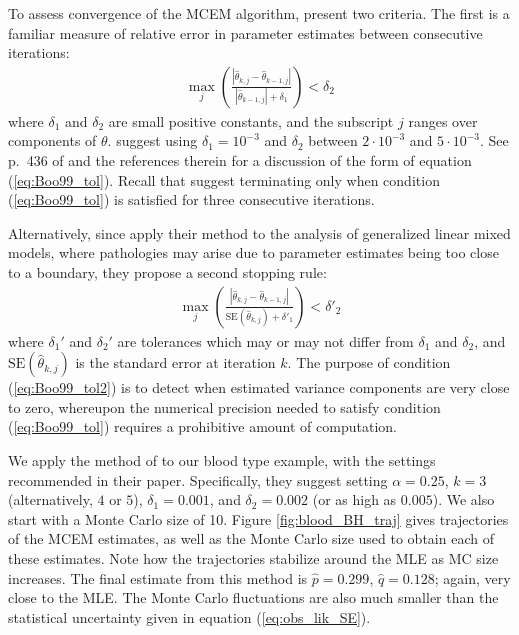 \documentclass[11pt, oneside]{article}   	%
\begin{document}
To assess convergence of the MCEM algorithm, \citeauthor{Boo99} present two criteria. The first is a familiar measure of relative error in parameter estimates between consecutive iterations:
%
\begin{align}
    \max_j \left( \frac{\left| \hat{\theta}_{k, j} - \hat{\theta}_{k-1,j} \right|}{\left| \hat{\theta}_{k-1,j} \right| + \delta_1} \right) < \delta_2 \label{eq:Boo99_tol}
\end{align}
%
where $\delta_1$ and $\delta_2$ are small positive constants, and the subscript $j$ ranges over components of $\theta$. \citeauthor{Boo99} suggest using $\delta_1 = 10^{-3}$ and $\delta_2$ between $2 \cdot 10^{-3}$ and $5 \cdot 10^{-3}$. See p.\ 436 of \citet{Sea06} and the references therein for a discussion of the form of equation (\ref{eq:Boo99_tol}). Recall that \citeauthor{Boo99} suggest terminating only when condition (\ref{eq:Boo99_tol}) is satisfied for three consecutive iterations.

Alternatively, since \citeauthor{Boo99} apply their method to the analysis of generalized linear mixed models, where pathologies may arise due to parameter estimates being too close to a boundary, they propose a second stopping rule:
%
\begin{align}
    \max_j \left( \frac{\left| \hat{\theta}_{k, j} - \hat{\theta}_{k-1,j} \right|}{\mathrm{SE}\left(\hat{\theta}_{k,j}\right) + \delta'_1} \right) < \delta'_2 \label{eq:Boo99_tol2}
\end{align}
%
where $\delta_1'$ and $\delta_2'$ are tolerances which may or may not differ from $\delta_1$ and $\delta_2$, and $\mathrm{SE}\left(\hat{\theta}_{k,j}\right)$ is the standard error at iteration $k$. The purpose of condition (\ref{eq:Boo99_tol2}) is to detect when estimated variance components are very close to zero, whereupon the numerical precision needed to satisfy condition (\ref{eq:Boo99_tol}) requires a prohibitive amount of computation.

We apply the method of \citeauthor{Boo99} to our blood type example, with the settings recommended in their paper. Specifically, they suggest setting $\alpha = 0.25$, $k = 3$ (alternatively, $4$ or $5$), $\delta_1 = 0.001$, and $\delta_2 = 0.002$ (or as high as $0.005$). We also start with a Monte Carlo size of 10. Figure \ref{fig:blood_BH_traj} gives trajectories of the MCEM estimates, as well as the Monte Carlo size used to obtain each of these estimates. Note how the trajectories stabilize around the MLE as MC size increases. The final estimate from this method is $\hat{p} = 0.299$, $\hat{q} = 0.128$; again, very close to the MLE. The Monte Carlo fluctuations are also much smaller than the statistical uncertainty given in equation (\ref{eq:obs_lik_SE}).
\end{document}
